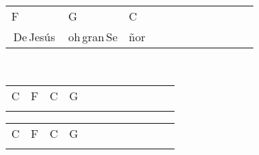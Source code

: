 \begin{multicols}{2}
\begin{minipage}{\columnwidth}
\noindent
\begin{tabular}{llllllllllll}
F&G&C\\
\,De\,Jesús\,&oh\,gran\,Se&ñor
\end{tabular}
\end{minipage}\\

\noindent
\begin{minipage}{\columnwidth}
\noindent
\noindent
\begin{tabular}{llllllllllll}
C&F&C&G\\
\quad\quad&\quad\quad&\quad\quad&
\end{tabular}

\noindent
\begin{tabular}{llllllllllll}
C&F&C&G\\
\quad\quad&\quad\quad&\quad\quad&
\end{tabular}
\end{minipage}\\

\end{multicols}